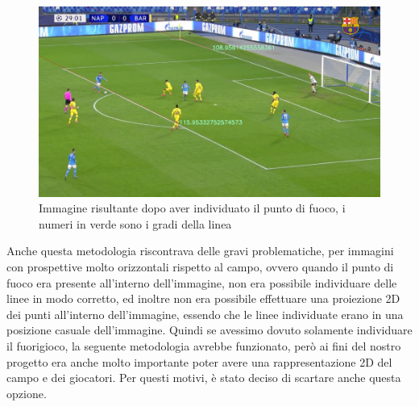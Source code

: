 \documentclass{article}
\begin{document}
\begin{figure}[h]
    \centering
    \includegraphics[width=0.7\linewidth]{capitoli/vanishingpoint.png}
    \caption{Immagine risultante dopo aver individuato il punto di fuoco, i numeri in verde sono i gradi della linea}
    \label{fig:enter-label}
\end{figure}

Anche questa metodologia riscontrava delle gravi problematiche, per immagini con prospettive molto orizzontali rispetto al campo, ovvero quando il punto di fuoco era presente all'interno dell'immagine, non era possibile individuare delle linee in modo corretto, ed inoltre non era possibile effettuare una proiezione 2D dei punti all'interno dell'immagine, essendo che le linee individuate erano in una posizione casuale dell'immagine. Quindi se avessimo dovuto solamente individuare il fuorigioco, la seguente metodologia avrebbe funzionato, però ai fini del nostro progetto era anche molto importante poter avere una rappresentazione 2D del campo e dei giocatori. Per questi motivi, è stato deciso di scartare anche questa opzione.
\\
\\
\end{document}
